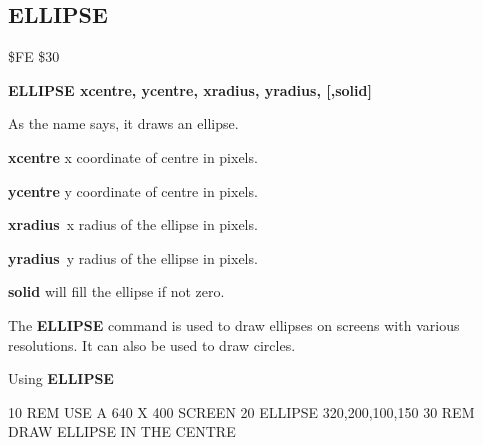 
\newpage
\subsection{ELLIPSE}
\begin{description}[leftmargin=3cm,style=nextline]
\item [Token:] \$FE \$30
\item [Format:] {\bf ELLIPSE xcentre, ycentre,
                xradius, yradius, [,solid]}
\item [Usage:] As the name says, it draws an ellipse.

               {\bf xcentre} x coordinate of centre in pixels.

               {\bf ycentre} y coordinate of centre in pixels.

               {\bf xradius} x radius of the ellipse in pixels.

               {\bf yradius} y radius of the ellipse in pixels.

               {\bf solid} will fill the ellipse if not zero.

\item [Remarks:] The {\bf ELLIPSE} command is used to draw ellipses on
               screens with various resolutions.
               It can also be used to draw circles.

\item [Example:] Using {\bf ELLIPSE}
\begin{screenoutput}
10 REM USE A 640 X 400 SCREEN
20 ELLIPSE 320,200,100,150
30 REM DRAW ELLIPSE IN THE CENTRE
\end{screenoutput}
\end{description}


\newpage
